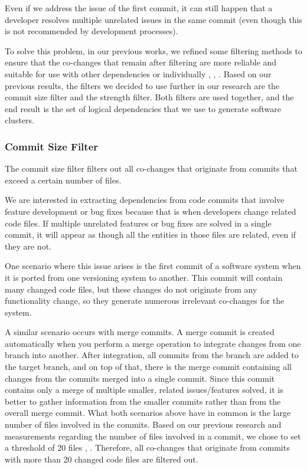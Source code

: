 \documentclass{ieeeaccess}
\begin{document}
Even if we address the issue of the first commit, it can still happen that a developer resolves multiple unrelated issues in the same commit (even though this is not recommended by development processes).

To solve this problem, in our previous works, we refined some filtering methods to ensure that the co-changes that remain after filtering are more reliable and suitable for use with other dependencies or individually \cite{b4}, \cite{b5}, \cite{b6}. Based on our previous results, the filters we decided to use further in our research are the commit size filter and the strength filter. Both filters are used together, and the end result is the set of logical dependencies that we use to generate software clusters.

\subsubsection{Commit Size Filter}

The commit size filter filters out all co-changes that originate from commits that exceed a certain number of files.

We are interested in extracting dependencies from code commits that involve feature development or bug fixes because that is when developers change related code files. If multiple unrelated features or bug fixes are solved in a single commit, it will appear as though all the entities in those files are related, even if they are not.

One scenario where this issue arises is the first commit of a software system when it is ported from one versioning system to another. This commit will contain many changed code files, but these changes do not originate from any functionality change, so they generate numerous irrelevant co-changes for the system.

A similar scenario occurs with merge commits. A merge commit is created automatically when you perform a merge operation to integrate changes from one branch into another. After integration, all commits from the branch are added to the target branch, and on top of that, there is the merge commit containing all changes from the commits merged into a single commit. Since this commit contains only a merge of multiple smaller, related issues/features solved, it is better to gather information from the smaller commits rather than from the overall merge commit.
What both scenarios above have in common is the large number of files involved in the commits. Based on our previous research and measurements regarding the number of files involved in a commit, we chose to set a threshold of 20 files \cite{b4}, \cite{b5}. Therefore, all co-changes that originate from commits with more than 20 changed code files are filtered out.
\end{document}
